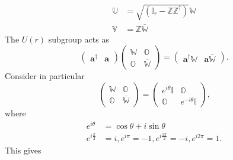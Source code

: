 \documentclass[aps, preprint]{revtex4}
\begin{document}
\begin{align}\mathbb{U} &  =\sqrt{\left (\mathbb{I}_{r} -\mathbb{Z} \mathbb{Z}^{ \dag }\right )} \mathbb{W} \\
\mathbb{V} &  =\mathbb{Z} \overline{\mathbb{W}}\end{align}The $U \left (r\right )$ subgroup acts as
\begin{equation}\left (\begin{array}{cc}\mathbf{a}^{ \dag } & \mathbf{a}\end{array}\right ) \left (\begin{array}{cc}\mathbb{W} & \mathbb{O} \\
\mathbb{O} & \overline{\mathbb{W}}\end{array}\right ) =\left (\begin{array}{cc}\mathbf{a}^{ \dag } \mathbb{W} & \mathbf{a} \overline{\mathbb{W}}\end{array}\right )\text{.}
\end{equation}Consider in particular
\begin{equation}\left (\begin{array}{cc}\mathbb{W} & \mathbb{O} \\
\mathbb{O} & \overline{\mathbb{W}}\end{array}\right ) =\left (\begin{array}{cc}e^{i \theta } \mathbb{I} & \mathbb{O} \\
\mathbb{O} & e^{ -i \theta } \mathbb{I}\end{array}\right )\text{,}
\end{equation}where
\begin{align}e^{i \theta } &  =\cos  \theta  +i \sin  \theta  \\
e^{i \frac{\pi }{2}} &  =i ,e^{i \pi } = -1 ,e^{i \frac{3 \pi }{2}} = -i ,e^{i 2 \pi } =1.\end{align}This gives
\end{document}
